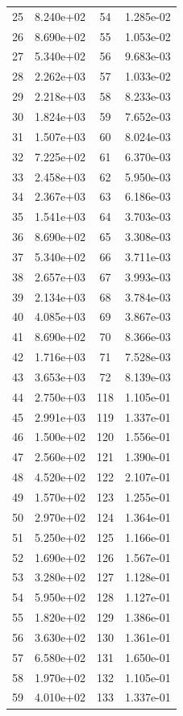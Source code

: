 \documentclass[12pt]{article}
\begin{document}
\begin{longtable}{@{}cccc@{}}
25 & 8.240e+02 & 54 & 1.285e-02 \\
26 & 8.690e+02 & 55 & 1.053e-02 \\
27 & 5.340e+02 & 56 & 9.683e-03 \\
28 & 2.262e+03 & 57 & 1.033e-02 \\
29 & 2.218e+03 & 58 & 8.233e-03 \\
30 & 1.824e+03 & 59 & 7.652e-03 \\
31 & 1.507e+03 & 60 & 8.024e-03 \\
32 & 7.225e+02 & 61 & 6.370e-03 \\
33 & 2.458e+03 & 62 & 5.950e-03 \\
34 & 2.367e+03 & 63 & 6.186e-03 \\
35 & 1.541e+03 & 64 & 3.703e-03 \\
36 & 8.690e+02 & 65 & 3.308e-03 \\
37 & 5.340e+02 & 66 & 3.711e-03 \\
38 & 2.657e+03 & 67 & 3.993e-03 \\
39 & 2.134e+03 & 68 & 3.784e-03 \\
40 & 4.085e+03 & 69 & 3.867e-03 \\
41 & 8.690e+02 & 70 & 8.366e-03 \\
42 & 1.716e+03 & 71 & 7.528e-03 \\
43 & 3.653e+03 & 72 & 8.139e-03 \\
44 & 2.750e+03 & 118 & 1.105e-01 \\
45 & 2.991e+03 & 119 & 1.337e-01 \\
46 & 1.500e+02 & 120 & 1.556e-01 \\
47 & 2.560e+02 & 121 & 1.390e-01 \\
48 & 4.520e+02 & 122 & 2.107e-01 \\
49 & 1.570e+02 & 123 & 1.255e-01 \\
50 & 2.970e+02 & 124 & 1.364e-01 \\
51 & 5.250e+02 & 125 & 1.166e-01 \\
52 & 1.690e+02 & 126 & 1.567e-01 \\
53 & 3.280e+02 & 127 & 1.128e-01 \\
54 & 5.950e+02 & 128 & 1.127e-01 \\
55 & 1.820e+02 & 129 & 1.386e-01 \\
56 & 3.630e+02 & 130 & 1.361e-01 \\
57 & 6.580e+02 & 131 & 1.650e-01 \\
58 & 1.970e+02 & 132 & 1.105e-01 \\
59 & 4.010e+02 & 133 & 1.337e-01 \\

\end{longtable}
\end{document}
